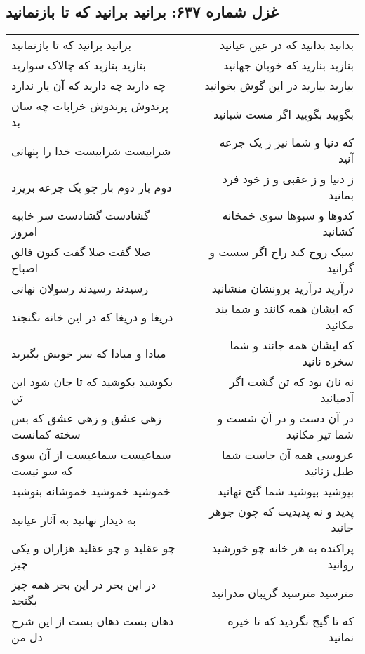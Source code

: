 \begin{center}
\section*{غزل شماره ۶۳۷: برانید برانید که تا بازنمانید}
\label{sec:0637}
\begin{longtable}{l p{0.5cm} r}
برانید برانید که تا بازنمانید
&&
بدانید بدانید که در عین عیانید
\\
بتازید بتازید که چالاک سوارید
&&
بنازید بنازید که خوبان جهانید
\\
چه دارید چه دارید که آن یار ندارد
&&
بیارید بیارید در این گوش بخوانید
\\
پرندوش پرندوش خرابات چه سان بد
&&
بگویید بگویید اگر مست شبانید
\\
شرابیست شرابیست خدا را پنهانی
&&
که دنیا و شما نیز ز یک جرعه آنید
\\
دوم بار دوم بار چو یک جرعه بریزد
&&
ز دنیا و ز عقبی و ز خود فرد بمانید
\\
گشادست گشادست سر خابیه امروز
&&
کدوها و سبوها سوی خمخانه کشانید
\\
صلا گفت صلا گفت کنون فالق اصباح
&&
سبک روح کند راح اگر سست و گرانید
\\
رسیدند رسیدند رسولان نهانی
&&
درآرید درآرید برونشان منشانید
\\
دریغا و دریغا که در این خانه نگنجند
&&
که ایشان همه کانند و شما بند مکانید
\\
مبادا و مبادا که سر خویش بگیرید
&&
که ایشان همه جانند و شما سخره نانید
\\
بکوشید بکوشید که تا جان شود این تن
&&
نه نان بود که تن گشت اگر آدمیانید
\\
زهی عشق و زهی عشق که بس سخته کمانست
&&
در آن دست و در آن شست و شما تیر مکانید
\\
سماعیست سماعیست از آن سوی که سو نیست
&&
عروسی همه آن جاست شما طبل زنانید
\\
خموشید خموشید خموشانه بنوشید
&&
بپوشید بپوشید شما گنج نهانید
\\
به دیدار نهانید به آثار عیانید
&&
پدید و نه پدیدیت که چون جوهر جانید
\\
چو عقلید و چو عقلید هزاران و یکی چیز
&&
پراکنده به هر خانه چو خورشید روانید
\\
در این بحر در این بحر همه چیز بگنجد
&&
مترسید مترسید گریبان مدرانید
\\
دهان بست دهان بست از این شرح دل من
&&
که تا گیج نگردید که تا خیره نمانید
\\
\end{longtable}
\end{center}
